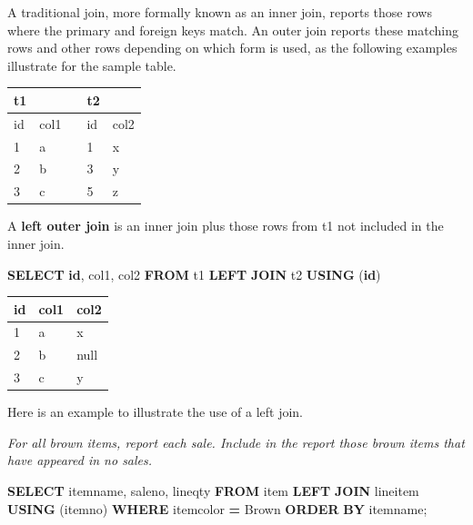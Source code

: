 \documentclass[
]{article}
\newenvironment{Shaded}{\begin{snugshade}}{\end{snugshade}}
\newcommand{\KeywordTok}[1]{\textcolor[rgb]{0.13,0.29,0.53}{\textbf{#1}}}
\newcommand{\NormalTok}[1]{#1}
\newcommand{\OperatorTok}[1]{\textcolor[rgb]{0.81,0.36,0.00}{\textbf{#1}}}
\newcommand{\StringTok}[1]{\textcolor[rgb]{0.31,0.60,0.02}{#1}}
\begin{document}
A traditional join, more formally known as an inner join, reports those
rows where the primary and foreign keys match. An outer join reports
these matching rows and other rows depending on which form is used, as
the following examples illustrate for the sample table.

\begin{longtable}[]{@{}lllll@{}}
\toprule()
t1 & & & t2 & \\
\midrule()
\endhead
id & col1 & & id & col2 \\
1 & a & & 1 & x \\
2 & b & & 3 & y \\
3 & c & & 5 & z \\
\bottomrule()
\end{longtable}

A \textbf{left outer join} is an inner join plus those rows from t1 not
included in the inner join.

\begin{Shaded}
\begin{Highlighting}[]
\KeywordTok{SELECT} \KeywordTok{id}\NormalTok{, col1, col2 }\KeywordTok{FROM}\NormalTok{ t1 }\KeywordTok{LEFT} \KeywordTok{JOIN}\NormalTok{ t2 }\KeywordTok{USING}\NormalTok{ (}\KeywordTok{id}\NormalTok{)}
\end{Highlighting}
\end{Shaded}

\begin{longtable}[]{@{}lll@{}}
\toprule()
id & col1 & col2 \\
\midrule()
\endhead
1 & a & x \\
2 & b & null \\
3 & c & y \\
\bottomrule()
\end{longtable}

Here is an example to illustrate the use of a left join.

\emph{For all brown items, report each sale. Include in the report those
brown items that have appeared in no sales.}

\begin{Shaded}
\begin{Highlighting}[]
\KeywordTok{SELECT}\NormalTok{ itemname, saleno, lineqty }\KeywordTok{FROM}\NormalTok{ item}
    \KeywordTok{LEFT} \KeywordTok{JOIN}\NormalTok{ lineitem }\KeywordTok{USING}\NormalTok{ (itemno)}
        \KeywordTok{WHERE}\NormalTok{ itemcolor }\OperatorTok{=} \StringTok{\textquotesingle{}Brown\textquotesingle{}}
        \KeywordTok{ORDER} \KeywordTok{BY}\NormalTok{ itemname;}
\end{Highlighting}
\end{Shaded}
\end{document}

